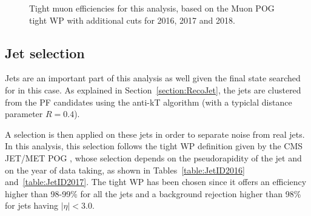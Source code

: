 \documentclass[a4paper, 10pt, openright]{report}
\begin{document}
\begin{figure}[htbp]
\centering
{}
\caption{Tight muon efficiencies for this analysis, based on the Muon \ac{POG} tight \ac{WP} with additional cuts for 2016, 2017 and 2018.}
\label{fig:MuonEff}
\end{figure}

\subsection{Jet selection} \label{section:JetSel}

Jets are an important part of this analysis as well given the final state searched for in this case. As explained in Section~\ref{section:RecoJet}, the jets are clustered from the \ac{PF} candidates using the anti-kT algorithm (with a typiclal distance parameter $R = 0.4$). 

A selection is then applied on these jets in order to separate noise from real jets. In this analysis, this selection follows the tight \ac{WP} definition given by the \ac{CMS} JET/MET \ac{POG} \cite{JETMETPOG}, whose selection depends on the pseudorapidity of the jet and on the year of data taking, as shown in Tables~\ref{table:JetID2016} and~\ref{table:JetID2017}. The tight \ac{WP} has been chosen since it offers an efficiency higher than 98-99\% for all the jets and a background rejection higher than 98\% for jets having $|\eta| < 3.0$.
\end{document}
